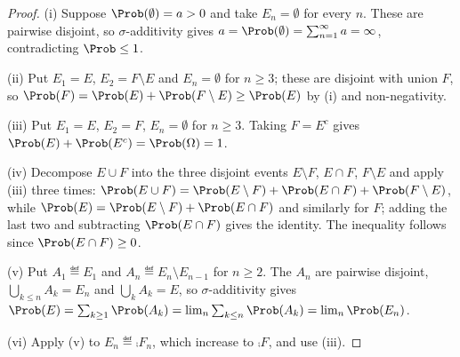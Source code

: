 \begin{proof}
	(i) Suppose $\Prob(\emptyset)=a>0$ and take $E_n=\emptyset$ for every $n$. These
	are pairwise disjoint, so $\sigma$-additivity gives
	$a=\Prob(\emptyset)=\sum_{n=1}^{\infty}a=\infty$, contradicting
	$\Prob\leq1$.

	(ii) Put $E_1=E$, $E_2=F\setminus E$ and $E_n=\emptyset$ for $n\geq3$; these are
	disjoint with union $F$, so
	$\Prob(F)=\Prob(E)+\Prob(F\setminus E)\geq\Prob(E)$ by (i) and non-negativity.

	(iii) Put $E_1=E$, $E_2=F$, $E_n=\emptyset$ for $n\geq3$. Taking $F=E^{c}$ gives
	$\Prob(E)+\Prob(E^{c})=\Prob(\Omega)=1$.

	(iv) Decompose $E\cup F$ into the three disjoint events
	$E\setminus F$, $E\cap F$, $F\setminus E$ and apply (iii) three times:
	$\Prob(E\cup F)=\Prob(E\setminus F)+\Prob(E\cap F)+\Prob(F\setminus E)$, while
	$\Prob(E)=\Prob(E\setminus F)+\Prob(E\cap F)$ and similarly for $F$; adding the
	last two and subtracting $\Prob(E\cap F)$ gives the identity. The inequality
	follows since $\Prob(E\cap F)\geq0$.

	(v) Put $A_1\eqdef E_1$ and $A_n\eqdef E_n\setminus E_{n-1}$ for $n\geq2$. The
	$A_n$ are pairwise disjoint, $\bigcup_{k\leq n}A_k=E_n$ and
	$\bigcup_kA_k=E$, so $\sigma$-additivity gives
	$\Prob(E)=\sum_{k\geq1}\Prob(A_k)=\lim_n\sum_{k\leq n}\Prob(A_k)=\lim_n\Prob(E_n)$.

	(vi) Apply (v) to $E_n\eqdef\comp{F_n}$, which increase to $\comp{F}$, and use
	(iii).
\end{proof}

